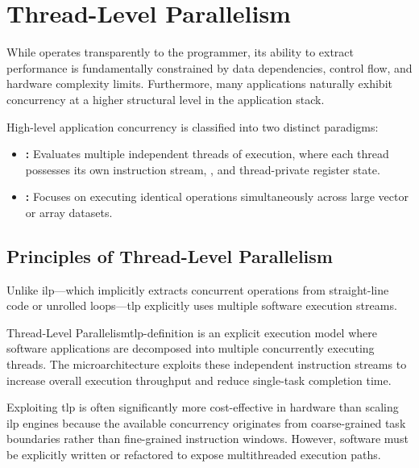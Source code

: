 \chapter{Thread-Level Parallelism}
\label{ch:thread_level_parallelism}

While  operates transparently to the programmer, its ability to extract performance is fundamentally constrained by data dependencies, control flow, and hardware complexity limits. Furthermore, many applications naturally exhibit concurrency at a higher structural level in the application stack. 

High-level application concurrency is classified into two distinct paradigms:
\begin{itemize}
    \item \textbf{:} Evaluates multiple independent threads of execution, where each thread possesses its own instruction stream, , and thread-private register state.
    \item \textbf{:} Focuses on executing identical operations simultaneously across large vector or array datasets.
\end{itemize}

\section{Principles of Thread-Level Parallelism}
\label{sec:tlp_principles}

Unlike \gls{ilp}—which implicitly extracts concurrent operations from straight-line code or unrolled loops—\gls{tlp} explicitly uses multiple software execution streams. 

\begin{definition}{Thread-Level Parallelism}{tlp-definition}
    \textbf{} is an explicit execution model where software applications are decomposed into multiple concurrently executing threads. The microarchitecture exploits these independent instruction streams to increase overall execution throughput and reduce single-task completion time.
\end{definition}

Exploiting \gls{tlp} is often significantly more cost-effective in hardware than scaling \gls{ilp} engines because the available concurrency originates from coarse-grained task boundaries rather than fine-grained instruction windows. However, software must be explicitly written or refactored to expose multithreaded execution paths.

